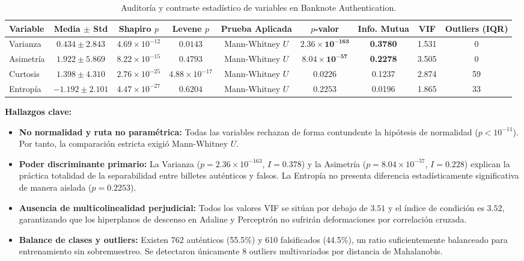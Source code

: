 \documentclass{article}
\begin{document}
\begin{table}[H]
\centering
\caption{Auditoría y contraste estadístico de variables en Banknote Authentication.}
\label{tab:eda_banknote}
\begin{adjustbox}{max width=\textwidth}
\begin{tabular}{lcccccccc}
\toprule
\textbf{Variable} & \textbf{Media $\pm$ Std} & \textbf{Shapiro $p$} & \textbf{Levene $p$} & \textbf{Prueba Aplicada} & \textbf{$p$-valor} & \textbf{Info. Mutua} & \textbf{VIF} & \textbf{Outliers (IQR)} \\
\midrule
Varianza  & $0.434 \pm 2.843$ & $4.69 \times 10^{-12}$ & $0.0143$ & Mann-Whitney $U$ & $\mathbf{2.36 \times 10^{-163}}$ & \textbf{0.3780} & 1.531 & 0 \\
Asimetría & $1.922 \pm 5.869$ & $8.22 \times 10^{-15}$ & $0.4793$ & Mann-Whitney $U$ & $\mathbf{8.04 \times 10^{-57}}$  & \textbf{0.2278} & 3.505 & 0 \\
Curtosis  & $1.398 \pm 4.310$ & $2.76 \times 10^{-25}$ & $4.88 \times 10^{-17}$ & Mann-Whitney $U$ & $0.0226$ & 0.1237 & 2.874 & 59 \\
Entropía  & $-1.192 \pm 2.101$ & $4.47 \times 10^{-27}$ & $0.6204$ & Mann-Whitney $U$ & $0.2253$ & 0.0196 & 1.865 & 33 \\
\bottomrule
\end{tabular}
\end{adjustbox}
\end{table}

\textbf{Hallazgos clave:}
\begin{itemize}
    \item \textbf{No normalidad y ruta no paramétrica:} Todas las variables rechazan de forma contundente la hipótesis de normalidad ($p < 10^{-11}$). Por tanto, la comparación estricta exigió Mann-Whitney $U$.
    \item \textbf{Poder discriminante primario:} La Varianza ($p = 2.36 \times 10^{-163}$, $I=0.378$) y la Asimetría ($p = 8.04 \times 10^{-57}$, $I=0.228$) explican la práctica totalidad de la separabilidad entre billetes auténticos y falsos. La Entropía no presenta diferencia estadísticamente significativa de manera aislada ($p = 0.2253$).
    \item \textbf{Ausencia de multicolinealidad perjudicial:} Todos los valores VIF se sitúan por debajo de $3.51$ y el índice de condición es $3.52$, garantizando que los hiperplanos de descenso en Adaline y Perceptrón no sufrirán deformaciones por correlación cruzada.
    \item \textbf{Balance de clases y outliers:} Existen 762 auténticos (55.5\%) y 610 falsificados (44.5\%), un ratio suficientemente balanceado para entrenamiento sin sobremuestreo. Se detectaron únicamente 8 outliers multivariados por distancia de Mahalanobis.
\end{itemize}
\end{document}
